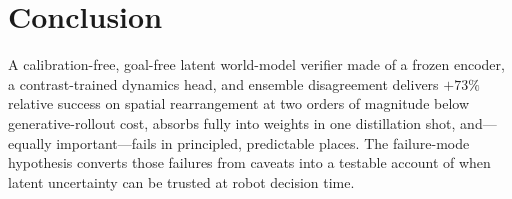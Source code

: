 \documentclass[11pt]{article}
\begin{document}
\section{Conclusion}
A calibration-free, goal-free latent world-model verifier made of a frozen encoder, a contrast-trained dynamics head, and ensemble disagreement delivers $+73\%$ relative success on spatial rearrangement at two orders of magnitude below generative-rollout cost, absorbs fully into weights in one distillation shot, and---equally important---fails in principled, predictable places. The failure-mode hypothesis converts those failures from caveats into a testable account of when latent uncertainty can be trusted at robot decision time.


\end{document}
